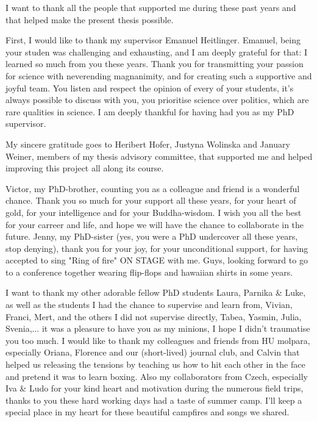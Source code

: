 I want to thank all the people that supported me during these past years and that helped make the present thesis possible.\par

First, I would like to thank my supervisor Emanuel Heitlinger. Emanuel, being your studen was challenging and exhausting, and I am deeply grateful for that: I learned so much from you these years. Thank you for transmitting your passion for science with neverending magnanimity, and for creating such a supportive and joyful team. You listen and respect the opinion of every of your students, it's always possible to discuss with you, you prioritise science over politics, which are rare qualities in science. I am deeply thankful for having had you as my PhD supervisor.\par

My sincere gratitude goes to Heribert Hofer, Justyna Wolinska and January Weiner, members of my thesis advisory committee, that supported me and helped improving this project all along its course.\par

Victor, my PhD-brother, counting you as a colleague and friend is a wonderful chance. Thank you so much for your support all these years, for your heart of gold, for your intelligence and for your Buddha-wisdom. I wish you all the best for your carreer and life, and hope we will have the chance to collaborate in the future. Jenny, my PhD-sister (yes, you were a PhD undercover all these years, stop denying), thank you for your joy, for your unconditional support, for having accepted to sing "Ring of fire" ON STAGE with me. Guys, looking forward to go to a conference together wearing flip-flops and hawaiian shirts in some years.\par

I want to thank my other adorable fellow PhD students Laura, Parnika \& Luke, as well as the students I had the chance to supervise and learn from, Vivian, Franci, Mert, and the others I did not supervise directly, Tabea, Yasmin, Julia, Svenia,... it was a pleasure to have you as my minions, I hope I didn't traumatise you too much. I would like to thank my colleagues and friends from HU molpara, especially Oriana, Florence and our (short-lived) journal club, and Calvin that helped us releasing the tensions by teaching us how to hit each other in the face and pretend it was to learn boxing. Also my collaborators from Czech, especially Iva \& Ludo for your kind heart and motivation during the numerous field trips, thanks to you these hard working days had a taste of summer camp. I'll keep a special place in my heart for these beautiful campfires and songs we shared.\par

